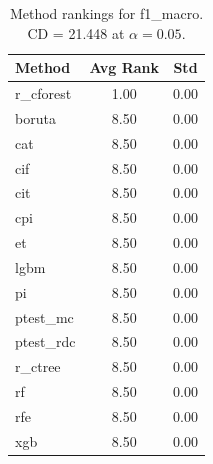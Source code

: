\begin{table}[h]
\centering
\caption{Method rankings for f1_macro. CD = 21.448 at $\alpha=0.05$.}
\label{tab:ranks_f1_macro}
\begin{tabular}{lcc}
\toprule
Method & Avg Rank & Std \\
\midrule
r_cforest & 1.00 & 0.00 \\
boruta & 8.50 & 0.00 \\
cat & 8.50 & 0.00 \\
cif & 8.50 & 0.00 \\
cit & 8.50 & 0.00 \\
cpi & 8.50 & 0.00 \\
et & 8.50 & 0.00 \\
lgbm & 8.50 & 0.00 \\
pi & 8.50 & 0.00 \\
ptest_mc & 8.50 & 0.00 \\
ptest_rdc & 8.50 & 0.00 \\
r_ctree & 8.50 & 0.00 \\
rf & 8.50 & 0.00 \\
rfe & 8.50 & 0.00 \\
xgb & 8.50 & 0.00 \\
\bottomrule
\end{tabular}
\end{table}